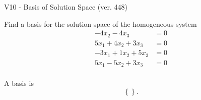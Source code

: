 \begin{exercise}
  \begin{exerciseTitle}V10 - Basis of Solution Space (ver. 448)\end{exerciseTitle}
  \begin{exerciseStatement}
    Find a basis for the solution space of the homogeneous system 
\begin{align*}
 -4 x_ 2 -4 x_ 3 &= 0  \\ 
  5 x_ 1 + 4 x_ 2 + 3 x_ 3 &= 0  \\ 
  -3 x_ 1 + 1 x_ 2 + 5 x_ 3 &= 0  \\ 
  5 x_ 1 -5 x_ 2 + 3 x_ 3 &= 0  \\ 
 \end{align*}


 
  \end{exerciseStatement}

  \begin{exerciseAnswer}
   A basis is   
\[\left\{\right\}.\]

  


  \end{exerciseAnswer}
\end{exercise}